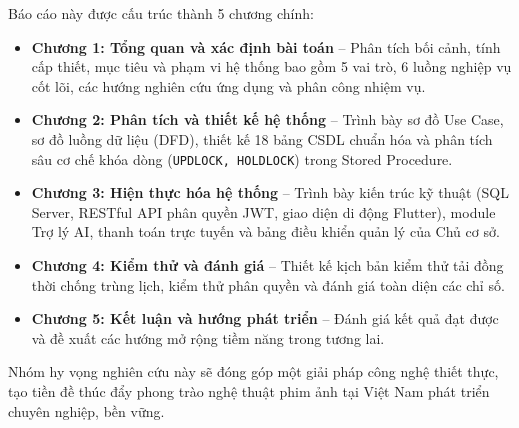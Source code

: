 Báo cáo này được cấu trúc thành 5 chương chính:
\begin{itemize}[leftmargin=2em]
    \item \textbf{Chương 1: Tổng quan và xác định bài toán} -- Phân tích bối cảnh, tính cấp thiết, mục tiêu và phạm vi hệ thống bao gồm 5 vai trò, 6 luồng nghiệp vụ cốt lõi, các hướng nghiên cứu ứng dụng và phân công nhiệm vụ.
    \item \textbf{Chương 2: Phân tích và thiết kế hệ thống} -- Trình bày sơ đồ Use Case, sơ đồ luồng dữ liệu (DFD), thiết kế 18 bảng CSDL chuẩn hóa và phân tích sâu cơ chế khóa dòng (\texttt{UPDLOCK, HOLDLOCK}) trong Stored Procedure.
    \item \textbf{Chương 3: Hiện thực hóa hệ thống} -- Trình bày kiến trúc kỹ thuật (SQL Server, RESTful API phân quyền JWT, giao diện di động Flutter), module Trợ lý AI, thanh toán trực tuyến và bảng điều khiển quản lý của Chủ cơ sở.
    \item \textbf{Chương 4: Kiểm thử và đánh giá} -- Thiết kế kịch bản kiểm thử tải đồng thời chống trùng lịch, kiểm thử phân quyền và đánh giá toàn diện các chỉ số.
    \item \textbf{Chương 5: Kết luận và hướng phát triển} -- Đánh giá kết quả đạt được và đề xuất các hướng mở rộng tiềm năng trong tương lai.
\end{itemize}

Nhóm hy vọng nghiên cứu này sẽ đóng góp một giải pháp công nghệ thiết thực, tạo tiền đề thúc đẩy phong trào nghệ thuật phim ảnh tại Việt Nam phát triển chuyên nghiệp, bền vững.
